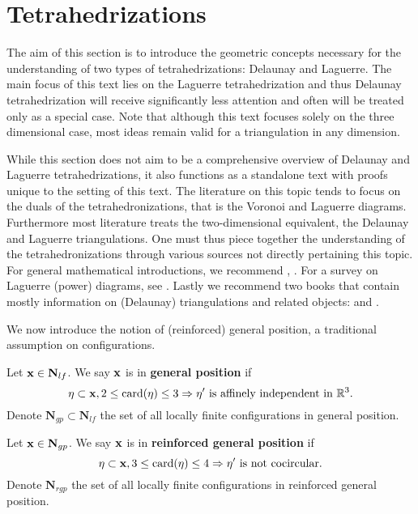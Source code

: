 \section{Tetrahedrizations}\label{sec:tetrahedrizations}
The aim of this section is to introduce the geometric concepts necessary for the understanding of two types of tetrahedrizations: Delaunay and Laguerre. The main focus of this text lies on the Laguerre tetrahedrization and thus Delaunay tetrahedrization will receive significantly less attention and often will be treated only as a special case. Note that although this text focuses solely on the three dimensional case, most ideas remain valid for a triangulation in any dimension.

While this section does not aim to be a comprehensive overview of Delaunay and Laguerre tetrahedrizations, it also functions as a standalone text with proofs unique to the setting of this text. The literature on this topic tends to focus on the duals of the tetrahedronizations, that is the Voronoi and Laguerre diagrams. Furthermore most literature treats the two-dimensional equivalent, the Delaunay and Laguerre triangulations. One must thus piece together the understanding of the tetrahedronizations through various sources not directly pertaining this topic. For general mathematical introductions, we recommend \cite{Okabe1992}, \cite{Gavrilova}. For a survey on Laguerre (power) diagrams, see \cite{Aurenhammer1987}. Lastly we recommend two books that contain mostly information on (Delaunay) triangulations and related objects: \cite{Delorea2010} and \cite{Aurenhammer2013}. \newline

\noindent We now introduce the notion of (reinforced) general position, a traditional assumption on configurations.

\begin{definition}
Let ${\mathbf{x}} \in \mathbf N_{lf}$. We say ${\mathbf{x}}$ is in \textbf{general position} if 
$$ \eta \subset {\mathbf{x}}, 2 \leq \mathrm{card}(\eta) \leq 3 \Rightarrow \eta' \text{ is affinely independent in } {\mathbb R^3}. $$   
Denote $\mathbf N_{gp}\subset \mathbf N_{lf}$ the set of all locally finite configurations in general position.
\end{definition}
 
\begin{definition}
Let ${\mathbf{x}} \in \mathbf N_{gp}$. We say ${\mathbf{x}}$ is in \textbf{reinforced general position} if 
$$ \eta \subset {\mathbf{x}}, 3 \leq \mathrm{card}(\eta) \leq 4 \Rightarrow \eta' \text{ is not cocircular.} $$   
Denote $\mathbf N_{rgp}$ the set of all locally finite configurations in reinforced general position.
\end{definition}


